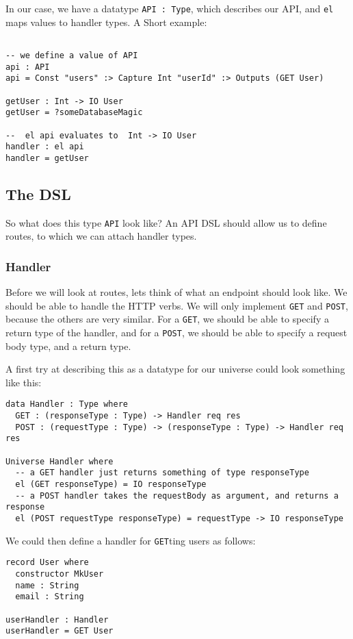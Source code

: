 \documentclass[12pt,a4paper]{article}
\begin{document}
 In our case, we have a datatype \texttt{API : Type}, which describes our API, and \texttt{el} maps values to handler types. A Short example:
 \begin{verbatim}

-- we define a value of API
api : API
api = Const "users" :> Capture Int "userId" :> Outputs (GET User)

getUser : Int -> IO User
getUser = ?someDatabaseMagic

--  el api evaluates to  Int -> IO User
handler : el api
handler = getUser
 \end{verbatim}
\subsection{The DSL}
So what does this type \texttt{API} look like? An API DSL should allow us to define routes, to which we can attach handler types.
\subsubsection{Handler}\label{sec:handler}
Before we will look at routes, lets think of what an endpoint should look like.
We should be able to handle the HTTP verbs. We will only implement \texttt{GET} and \texttt{POST}, because the others are very similar.
For a \texttt{GET}, we should be able to specify a return type of the handler,  and for a \texttt{POST}, we should be able to
specify a request body type, and a return type.


A first try at describing this as a datatype for our universe  could look something like this:
\begin{listing}
  \begin{verbatim}
data Handler : Type where
  GET : (responseType : Type) -> Handler req res
  POST : (requestType : Type) -> (responseType : Type) -> Handler req res

Universe Handler where
  -- a GET handler just returns something of type responseType
  el (GET responseType) = IO responseType
  -- a POST handler takes the requestBody as argument, and returns a response
  el (POST requestType responseType) = requestType -> IO responseType

  \end{verbatim}
\end{listing}

We could then define a handler for \texttt{GET}ting users as follows:
\begin{verbatim}
record User where
  constructor MkUser
  name : String
  email : String

userHandler : Handler
userHandler = GET User
\end{verbatim}
\end{document}
